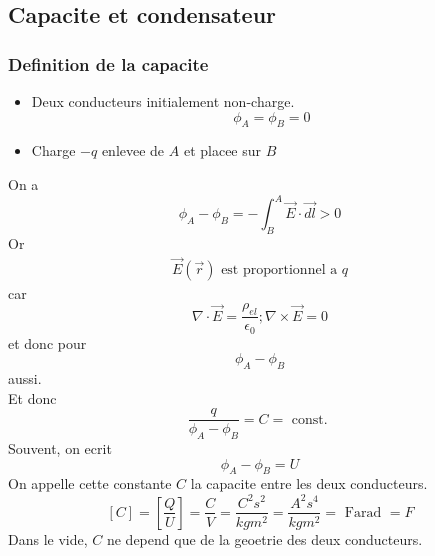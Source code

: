 \documentclass[../main.tex]{subfiles}
\begin{document}
\subsection{Capacite et condensateur}
\subsubsection{Definition de la capacite}
\begin{itemize}
\item Deux conducteurs initialement non-charge.
	\[ 
		\phi_A = \phi_B =0
	\]
	
\item Charge $-q$ enlevee de $A$ et placee sur $B$
\end{itemize}
On a 
\[ 
\phi_A- \phi_B = - \int_B^{A} \vec{E}\cdot \vec{dl}	>0	
\]
Or
\begin{align*}
	\vec{E}( \vec{r}) \text{ est proportionnel a } q
\end{align*}
car
\[ 
\nabla \cdot \vec{E} = \frac{\rho_{el} }{\epsilon_0}; \nabla\times \vec{E}=0
\]
et donc pour
\[ 
\phi_A-\phi_B
\]
aussi.\\
Et donc
\[ 
\frac{q}{\phi_A-\phi_B}= C = \text{ const. } 
\]
Souvent, on ecrit
\[ 
\phi_A-\phi_B = U
\]
On appelle cette constante $C$ la capacite entre les deux conducteurs.
\[ 
[ C] = [ \frac{Q}{U}] = \frac{C}{V}= \frac{C^{2}s^{2}}{kg m^{2}}= \frac{A^{2}s^{4}}{kg m^{2}}= \text{ Farad } =F
\]
Dans le vide, $C$ ne depend que de la geoetrie des deux conducteurs.
\end{document}
